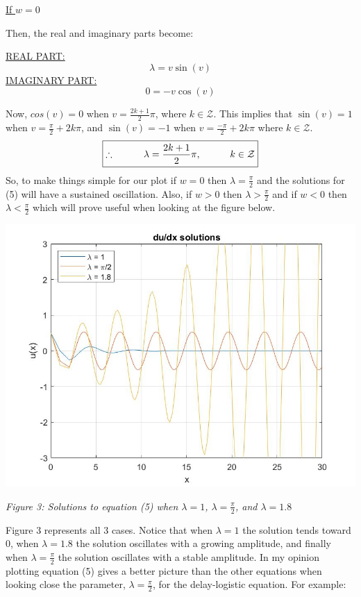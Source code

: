 \documentclass{article}
\begin{document}
\begin{center}
    \underline{If $w = 0$}
\end{center}
Then, the real and imaginary parts become:
\begin{center}
\underline{REAL PART:}
$$\boxed{\lambda = v\sin{(v)}}$$
\underline{IMAGINARY PART:}
$$\boxed{0 = -v\cos{(v)}}$$
\end{center}
Now, $cos(v) = 0$ when $v = \frac{2k+1}{2}\pi$, where $k \in \mathcal{Z}$. This implies that $\sin{(v)} = 1$ when 
$v = \frac{\pi}{2} + 2k\pi$, and $\sin{(v)} = -1$ when $v = \frac{-\pi}{2} + 2k\pi$ where $k \in \mathcal{Z}$. 
$$\boxed{\therefore \indent \indent \lambda = \frac{2k+1}{2}\pi, \indent \indent k \in \mathcal{Z}}$$
So, to make things simple for our plot if $ w = 0 $ then $\lambda = \frac{\pi}{2}$ and the solutions for (5) will have a sustained oscillation. Also, if $ w > 0 $ then $\lambda > \frac{\pi}{2}$ and if $ w < 0 $ then $\lambda < \frac{\pi}{2}$ which will prove useful when looking at the figure below.

\bigskip
\begin{center}
\includegraphics[width=15cm]{du solutions.jpg}

\textit{Figure 3: Solutions to equation (5) when $\lambda = 1$, $\lambda = \frac{\pi}{2}$, and $\lambda = 1.8$}

\end{center}
Figure 3 represents all 3 cases. Notice that when $\lambda = 1$ the solution tends toward $0$, when $\lambda = 1.8$ the solution oscillates with a growing amplitude, and finally when $\lambda = \frac{\pi}{2}$ the solution oscillates with a stable amplitude. In my opinion plotting equation (5) gives a better picture than the other equations when looking close the parameter, $\lambda = \frac{\pi}{2}$, for the delay-logistic equation. For example:
\end{document}
